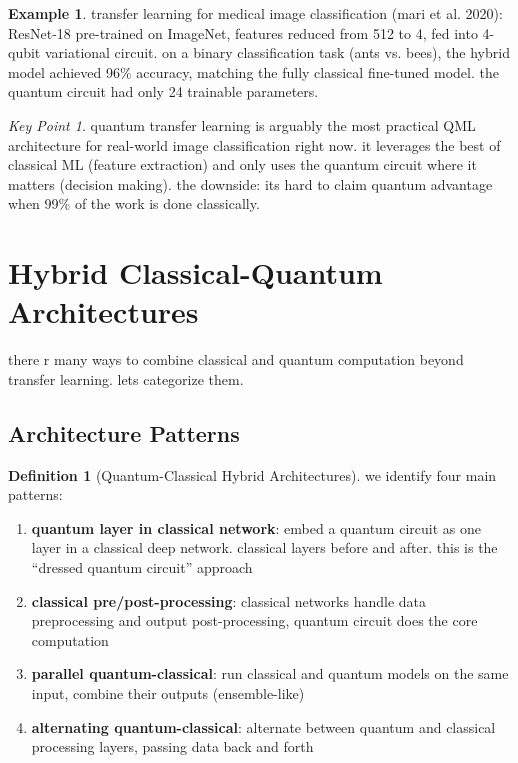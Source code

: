 \documentclass[11pt,a4paper]{article}
\theoremstyle{definition}
\newtheorem{definition}{Definition}[section]
\newtheorem{example}{Example}[section]
\theoremstyle{remark}
\newtheorem*{keypoint}{Key Point}
\begin{document}
\begin{example}
transfer learning for medical image classification (mari et al. 2020): ResNet-18 pre-trained on ImageNet, features reduced from 512 to 4, fed into 4-qubit variational circuit. on a binary classification task (ants vs. bees), the hybrid model achieved 96\% accuracy, matching the fully classical fine-tuned model. the quantum circuit had only 24 trainable parameters.
\end{example}

\begin{keypoint}
quantum transfer learning is arguably the most practical QML architecture for real-world image classification right now. it leverages the best of classical ML (feature extraction) and only uses the quantum circuit where it matters (decision making). the downside: its hard to claim quantum advantage when 99\% of the work is done classically.
\end{keypoint}

\section{Hybrid Classical-Quantum Architectures}

there r many ways to combine classical and quantum computation beyond transfer learning. lets categorize them.

\subsection{Architecture Patterns}

\begin{definition}[Quantum-Classical Hybrid Architectures]
we identify four main patterns:
\begin{enumerate}[label=(\alph*)]
    \item \textbf{quantum layer in classical network}: embed a quantum circuit as one layer in a classical deep network. classical layers before and after. this is the ``dressed quantum circuit'' approach
    \item \textbf{classical pre/post-processing}: classical networks handle data preprocessing and output post-processing, quantum circuit does the core computation
    \item \textbf{parallel quantum-classical}: run classical and quantum models on the same input, combine their outputs (ensemble-like)
    \item \textbf{alternating quantum-classical}: alternate between quantum and classical processing layers, passing data back and forth
\end{enumerate}
\end{definition}
\end{document}
